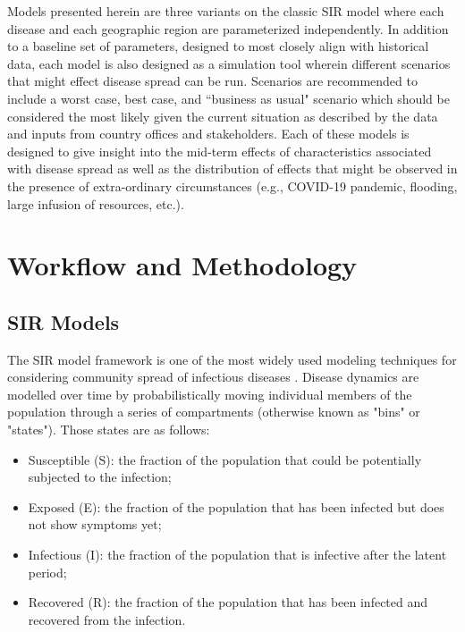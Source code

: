 \documentclass[letter,12pt, usenames,dvipsnames]{article}
\begin{document}
Models presented herein are three variants on the classic SIR model \cite{basicSIR} where each disease and each geographic region are parameterized independently. In addition to a baseline set of parameters, designed to most closely align with historical data, each model is also designed as a simulation tool wherein different scenarios that might effect disease spread can be run. Scenarios are recommended to include a worst case, best case, and ``business as usual" scenario which should be considered the most likely given the current situation as described by the data and inputs from country offices and stakeholders.   Each of these models is designed to give insight into the mid-term effects of characteristics associated with disease spread as well as the distribution of effects that might be observed in the presence of extra-ordinary circumstances (e.g., COVID-19 pandemic, flooding, large infusion of resources, etc.).
 




\section{Workflow and Methodology}

\subsection{SIR Models}
\label{sec:SIR}
The SIR model framework is one of the most widely used modeling techniques for considering community spread of infectious diseases \cite{basicSIR}.  Disease dynamics are modelled over time by probabilistically moving individual members of the population through a series of compartments (otherwise known as "bins" or "states").  Those states are as follows:
\begin{itemize}
    \item Susceptible (S): the fraction of the population that could be potentially subjected to the infection;
    \item Exposed (E): the fraction of the population that has been infected but does not show symptoms yet;
    \item Infectious (I): the fraction of the population that is infective after the latent period;
    \item Recovered (R): the fraction of the population that has been infected and recovered from the infection.\\
\end{itemize}
\end{document}
